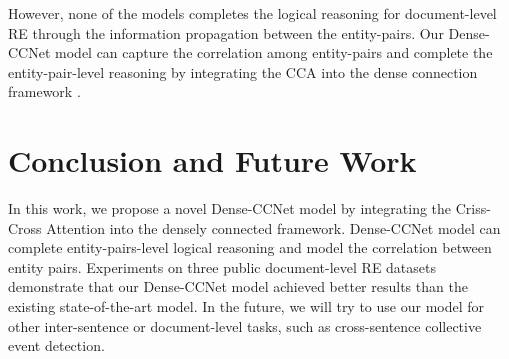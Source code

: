 \documentclass[11pt]{article}
\begin{document}
However, none of the models completes the logical reasoning for document-level RE through the information propagation between the entity-pairs.
Our Dense-CCNet model can capture the correlation among entity-pairs and complete the entity-pair-level reasoning by integrating the CCA \cite{c:116} into the dense connection framework \cite{c:121}.


\section{Conclusion and Future Work}
In this work, we propose a novel Dense-CCNet model by integrating the Criss-Cross Attention into the densely connected framework. 
Dense-CCNet model can complete entity-pairs-level logical reasoning and model the correlation between entity pairs.
Experiments on three public document-level RE datasets demonstrate that our Dense-CCNet model achieved better results than the existing state-of-the-art model.
In the future, we will try to use our model for other inter-sentence or document-level tasks, such as cross-sentence collective event detection.




\begin{table*}[]
\centering
{}
\caption{\label{tab5} Summary of DocRED, CDR and GDA datasets.
}
\end{table*}
\end{document}
